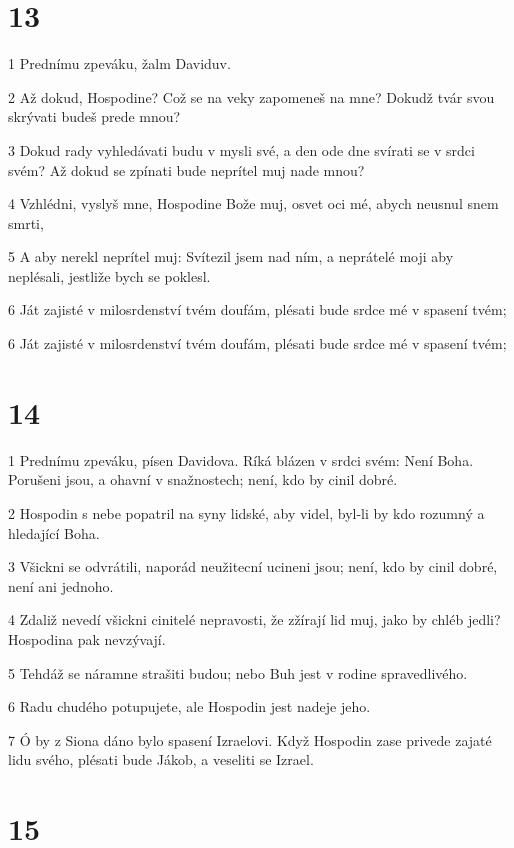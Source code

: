 \chapter{13}

\par 1 Prednímu zpeváku, žalm Daviduv.
\par 2 Až dokud, Hospodine? Což se na veky zapomeneš na mne? Dokudž tvár svou skrývati budeš prede mnou?
\par 3 Dokud rady vyhledávati budu v mysli své, a den ode dne svírati se v srdci svém? Až dokud se zpínati bude neprítel muj nade mnou?
\par 4 Vzhlédni, vyslyš mne, Hospodine Bože muj, osvet oci mé, abych neusnul snem smrti,
\par 5 A aby nerekl neprítel muj: Svítezil jsem nad ním, a neprátelé moji aby neplésali, jestliže bych se poklesl.
\par 6 Ját zajisté v milosrdenství tvém doufám, plésati bude srdce mé v spasení tvém;
\par 6 Ját zajisté v milosrdenství tvém doufám, plésati bude srdce mé v spasení tvém;

\chapter{14}

\par 1 Prednímu zpeváku, písen Davidova. Ríká blázen v srdci svém: Není Boha. Porušeni jsou, a ohavní v snažnostech; není, kdo by cinil dobré.
\par 2 Hospodin s nebe popatril na syny lidské, aby videl, byl-li by kdo rozumný a hledající Boha.
\par 3 Všickni se odvrátili, naporád neužitecní ucineni jsou; není, kdo by cinil dobré, není ani jednoho.
\par 4 Zdaliž nevedí všickni cinitelé nepravosti, že zžírají lid muj, jako by chléb jedli? Hospodina pak nevzývají.
\par 5 Tehdáž se náramne strašiti budou; nebo Buh jest v rodine spravedlivého.
\par 6 Radu chudého potupujete, ale Hospodin jest nadeje jeho.
\par 7 Ó by z Siona dáno bylo spasení Izraelovi. Když Hospodin zase privede zajaté lidu svého, plésati bude Jákob, a veseliti se Izrael.

\chapter{15}


